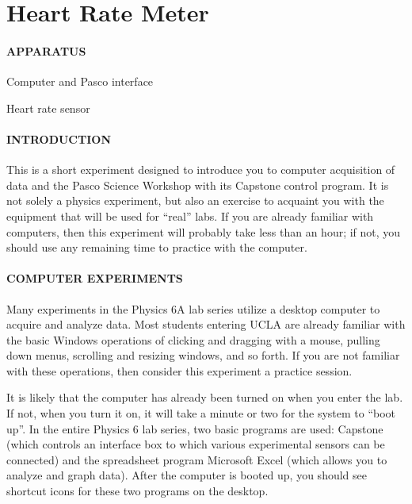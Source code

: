 
\vspace{-5ex}\part*{Heart Rate Meter}

\subsection*{APPARATUS}

\vspace{-0.5ex}
\vphantom{.}
\squishlist
\item Computer and Pasco interface
\item Heart rate sensor
\squishend

\subsection*{INTRODUCTION}

This is a short experiment designed to introduce you to computer acquisition of data and the Pasco Science Workshop with its Capstone control program.  It is not solely a physics experiment, but also an exercise to acquaint you with the equipment that will be used for ``real'' labs.  If you are already familiar with computers, then this experiment will probably take less than an hour; if not, you should use any remaining time to practice with the computer.

\subsection*{COMPUTER EXPERIMENTS}

Many experiments in the Physics 6A lab series utilize a desktop computer to acquire and analyze data.  Most students entering UCLA are already familiar with the basic Windows operations of clicking and dragging with a mouse, pulling down menus, scrolling and resizing windows, and so forth.  If you are not familiar with these operations, then consider this experiment a practice session.

It is likely that the computer has already been turned on when you enter the lab.  If not, when you turn it on, it will take a minute or two for the system to ``boot up''.  In the entire Physics 6 lab series, two basic programs are used: Capstone (which controls an interface box to which various experimental sensors can be connected) and the spreadsheet program Microsoft Excel (which allows you to analyze and graph data).  After the computer is booted up, you should see shortcut icons for these two programs on the desktop.

